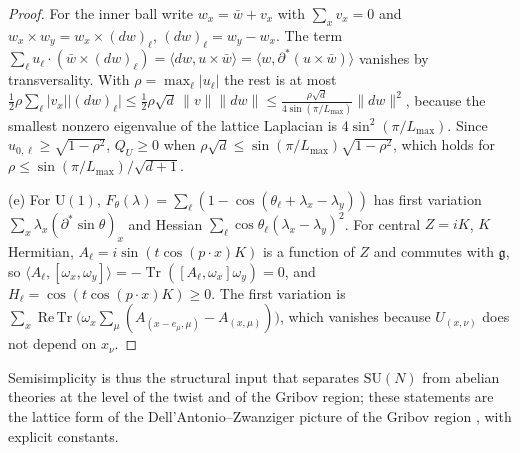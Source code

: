 \documentclass[11pt,a4paper]{amsart}
\theoremstyle{definition}
\theoremstyle{remark}
\numberwithin{equation}{section}
\DeclareMathOperator{\Tr}{Tr}        %
\DeclareMathOperator{\ReTr}{Re\,Tr}  %
\newcommand{\ip}[2]{\langle #1,#2\rangle}  %
\newcommand{\norm}[1]{\lVert #1\rVert}     %
\newcommand{\abs}[1]{\lvert #1\rvert}      %
\newcommand{\SU}{\mathrm{SU}}              %
\newcommand{\U}{\mathrm{U}}                %
\begin{document}
\begin{proof}
For the inner ball write $w_x=\bar w+v_x$ with $\sum_xv_x=0$ and $w_x\times w_y=w_x\times(dw)_\ell$, $(dw)_\ell=w_y-w_x$. The term $\sum_\ell u_\ell\cdot(\bar w\times(dw)_\ell)=\ip{dw}{u\times\bar w}=\ip w{\partial^*(u\times\bar w)}$ vanishes by transversality. With $\rho=\max_\ell\abs{u_\ell}$ the rest is at most $\frac12\rho\sum_\ell\abs{v_x}\abs{(dw)_\ell}\le\frac12\rho\sqrt d\,\norm v\norm{dw}\le\frac{\rho\sqrt d}{4\sin(\pi/L_{\max})}\norm{dw}^2$, because the smallest nonzero eigenvalue of the lattice Laplacian is $4\sin^2(\pi/L_{\max})$. Since $u_{0,\ell}\ge\sqrt{1-\rho^2}$, $Q_U\ge0$ when $\rho\sqrt d\le\sin(\pi/L_{\max})\sqrt{1-\rho^2}$, which holds for $\rho\le\sin(\pi/L_{\max})/\sqrt{d+1}$.

(e) For $\U(1)$, $F_\theta(\lambda)=\sum_\ell(1-\cos(\theta_\ell+\lambda_x-\lambda_y))$ has first variation $\sum_x\lambda_x(\partial^*\sin\theta)_x$ and Hessian $\sum_\ell\cos\theta_\ell(\lambda_x-\lambda_y)^2$. For central $Z=iK$, $K$ Hermitian, $A_\ell=i\sin(t\cos(p\cdot x)K)$ is a function of $Z$ and commutes with $\mathfrak g$, so $\ip{A_\ell}{[\omega_x,\omega_y]}=-\Tr([A_\ell,\omega_x]\omega_y)=0$, and $H_\ell=\cos(t\cos(p\cdot x)K)\ge0$. The first variation is $\sum_x\ReTr\bigl(\omega_x\sum_\mu(A_{(x-e_\mu,\mu)}-A_{(x,\mu)})\bigr)$, which vanishes because $U_{(x,\nu)}$ does not depend on $x_\nu$.
\end{proof}

Semisimplicity is thus the structural input that separates $\SU(N)$ from abelian theories at the level of the twist and of the Gribov region; these statements are the lattice form of the Dell'Antonio--Zwanziger picture of the Gribov region \cite{dellantonio1991,zwanziger1994,gribov1978}, with explicit constants.
\end{document}
